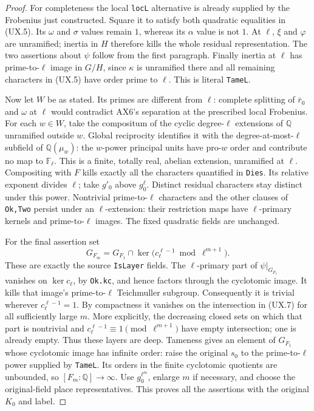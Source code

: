 \begin{proof}
For completeness the local \texttt{locL} alternative is
already supplied by the Frobenius just constructed.  Square
it to satisfy both quadratic equalities in (UX.5).  Its
$\omega$ and $\sigma$ values remain $1$, whereas its
$\alpha$ value is not $1$.  At $\ell$, $\xi$ and
$\varphi$ are unramified; inertia in $H$ therefore kills
the whole residual representation.  The two assertions
about $\psi$ follow from the first paragraph.  Finally
inertia at $\ell$ has prime-to-$\ell$ image in $G/H$,
since $\kappa$ is unramified there and all remaining
characters in (UX.5) have order prime to $\ell$.
This is literal \texttt{TameL}.

Now let $W$ be as stated.  Its primes are different from
$\ell$: complete splitting of $\bar r_0$ and $\omega$ at
$\ell$ would contradict AX6's separation at the prescribed
local Frobenius.  For each $w\in W$, take the compositum
of the cyclic degree-$\ell$ extensions of $\mathbb Q$
unramified outside $w$.  Global reciprocity identifies it
with the degree-at-most-$\ell$ subfield of
$\mathbb Q(\mu_w)$: the $w$-power principal units have
pro-$w$ order and contribute no map to $\mathbb F_\ell$.
This is a finite, totally real, abelian extension,
unramified at $\ell$.  Compositing with $F$ kills exactly
all the characters quantified in \texttt{Dies}.  Its
relative exponent divides $\ell$; take $g'_0$ above
$g_0^\ell$.  Distinct residual characters stay distinct
under this power.  Nontrivial prime-to-$\ell$ characters
and the other clauses of \texttt{Ok,Two} persist under an
$\ell$-extension: their restriction maps have
$\ell$-primary kernels and prime-to-$\ell$ images.
The fixed quadratic fields are unchanged.

For the final assertion set
\[
 G_{F_m}=G_{F_1}\cap
 \ker\bigl(c_\ell^{\ell-1}\bmod\ell^{m+1}\bigr).
 \tag{UX.7}
\]
These are exactly the source \texttt{IsLayer} fields.
The $\ell$-primary part of $\psi|_{G_{F_1}}$ vanishes
on $\ker c_\ell$, by \texttt{Ok.kc}, and hence factors
through the cyclotomic image.  It kills that image's
prime-to-$\ell$ Teichmuller subgroup.  Consequently
it is trivial wherever $c_\ell^{\ell-1}=1$.
By compactness it
vanishes on the intersection in (UX.7) for all sufficiently
large $m$.  More explicitly, the decreasing closed sets
on which that part is nontrivial and
$c_\ell^{\ell-1}\equiv1\pmod{\ell^{m+1}}$ have empty
intersection; one is already empty.  Thus these layers
are deep.  Tameness gives an element of $G_{F_1}$ whose
cyclotomic image has infinite order: raise the original
$s_0$ to the prime-to-$\ell$ power supplied by
\texttt{TameL}.  Its orders in the finite cyclotomic
quotients are unbounded, so $[F_m:\mathbb Q]\to\infty$.
Use $g_0^{\ell^m}$, enlarge $m$ if necessary, and choose
the original-field place representatives.  This proves
all the assertions with the original $K_0$ and label.
\end{proof}

